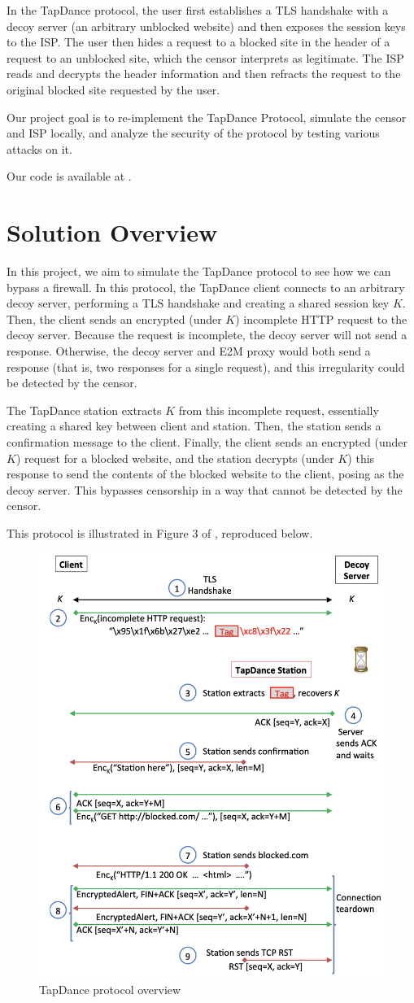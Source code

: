 \documentclass[conference]{IEEEtran}
\begin{document}
In the TapDance protocol, the user first establishes a TLS handshake with a decoy server (an arbitrary unblocked website) and then exposes the session keys to the ISP. The user then hides a request to a blocked site in the header of a request to an unblocked site, which the censor interprets as legitimate. The ISP reads and decrypts the header information and then refracts the request to the original blocked site requested by the user.

Our project goal is to re-implement the TapDance Protocol, simulate the censor and ISP locally, and analyze the security of the protocol by testing various attacks on it.

Our code is available at \cite{TapDanceImpl}.

\section{Solution Overview}

In this project, we aim to simulate the TapDance protocol to see how we can bypass a firewall. In this protocol, the TapDance client connects to an arbitrary decoy server, performing a TLS handshake and creating a shared session key $K$. Then, the client sends an encrypted (under $K$) incomplete HTTP request to the decoy server. Because the request is incomplete, the decoy server will not send a response. Otherwise, the decoy server and E2M proxy would both send a response (that is, two responses for a single request), and this irregularity could be detected by the censor.

The TapDance station extracts $K$ from this incomplete request, essentially creating a shared key between client and station. Then, the station sends a confirmation message to the client. Finally, the client sends an encrypted (under $K$) request for a blocked website, and the station decrypts (under $K$) this response to send the contents of the blocked website to the client, posing as the decoy server. This bypasses censorship in a way that cannot be detected by the censor.

This protocol is illustrated in Figure 3 of \cite{tapdance}, reproduced below.

\begin{figure}[h]
    \centering
    \includegraphics[width=0.5\linewidth]{img/tapdance_fig3.png}
    \caption{TapDance protocol overview}
    \label{tapdance_overview}
\end{figure}
\end{document}
